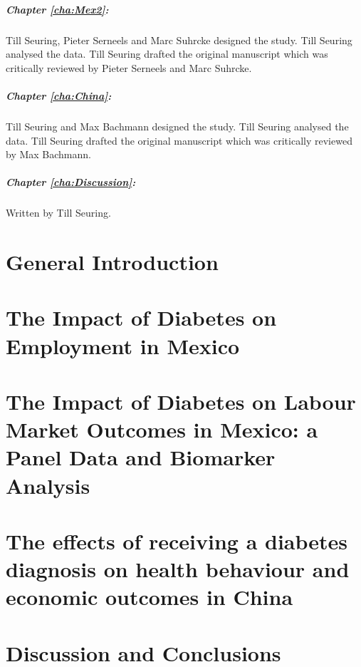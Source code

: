 \paragraph{Chapter \ref{cha:Mex2}:} Till Seuring, Pieter Serneels and Marc Suhrcke designed the study. Till Seuring analysed the data. Till Seuring drafted the original manuscript which was critically reviewed by Pieter Serneels and Marc Suhrcke.

\paragraph{Chapter \ref{cha:China}:} Till Seuring and Max Bachmann designed the study. Till Seuring analysed the data. Till Seuring drafted the original manuscript which was critically reviewed by Max Bachmann.

\paragraph{Chapter \ref{cha:Discussion}:} Written by Till Seuring.


	
\chapter{\label{cha:intro}General Introduction}


\chapter{\label{cha:Mex1}The Impact of Diabetes on Employment in Mexico}

\chapter{\label{cha:Mex2}The Impact of Diabetes on Labour Market Outcomes in Mexico: a Panel Data and Biomarker Analysis}

\chapter{\label{cha:China}The effects of receiving a diabetes diagnosis on health behaviour and economic outcomes in China}

\chapter{\label{cha:Discussion}Discussion and Conclusions}

\printbibliography
          
